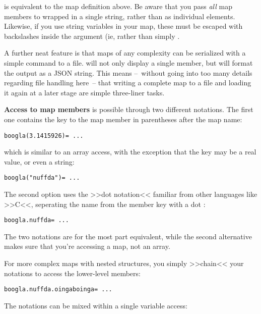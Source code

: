 is equivalent to the map definition above. Be aware that you pass
\emph{all} map members to  wrapped in a single string, rather
than as individual elements. Likewise, if you use string variables in
your map, these must be escaped with backslashes inside the 
argument (ie,  rather than
simply .

A further neat feature is that maps of any complexity can be serialized
with a simple  command to a file.  will not only
display a single member, but will format the output as a JSON string. This
means --~without going into too many details regarding file handling
here~-- that writing a complete map to a file and loading it again at a
later stage are simple three-liner tasks.

\textbf{Access to map members}  is possible
through two different notations. The first one contains the key to the
map member in parentheses after the map name: 

\begin{lstlisting}
boogla(3.1415926)= ...
\end{lstlisting}

which is similar to an array access, with the exception that the key may
be a real value, or even a string:

\begin{lstlisting}
boogla("nuffda")= ...
\end{lstlisting}

The second option uses the >>dot notation<< 
familiar from other languages like >>C<<, seperating the name from the
member key with a dot :

\begin{lstlisting}
boogla.nuffda= ...
\end{lstlisting}

The two notations are for the most part equivalent, while the second
alternative makes sure that you're accessing a map, not an array.

For more complex maps with nested structures, you simply >>chain<< your
notations to access the lower-level members:

\begin{lstlisting}
boogla.nuffda.oingaboinga= ...
\end{lstlisting}

The notations can be mixed within a single variable access: 

